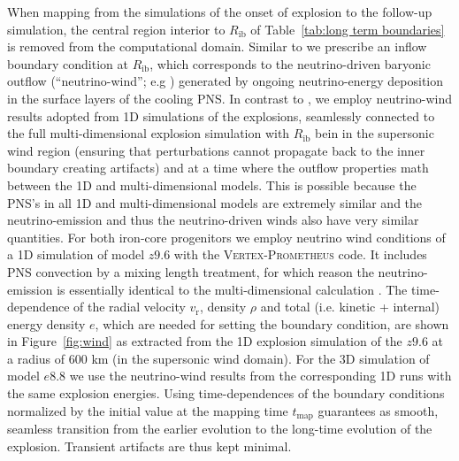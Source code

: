 \documentclass[fleqn,usenatbib]{mnras}
\newcommand{\vertexprom}{\textsc{Vertex-Prometheus}\xspace}
\newcommand{\GEO}[1]{{\color{red}#1}}
\begin{document}
\GEO{
When mapping from the simulations of the onset of explosion to the follow-up simulation, the central region interior to $R_{\mathrm{ib}}$ of Table~\ref{tab:long term boundaries} is removed from the computational domain. Similar to \cite{Wongwathanarat2015} we prescribe an inflow boundary condition at $R_{\mathrm{ib}}$, which corresponds to the neutrino-driven baryonic outflow (``neutrino-wind''; e.g \citealt{Qian1996}) generated by ongoing neutrino-energy deposition in the surface layers of the cooling PNS. In contrast to \cite{Wongwathanarat2015}, we employ neutrino-wind results adopted from 1D simulations of the explosions, seamlessly connected to the full multi-dimensional explosion simulation with $R_{\mathrm{ib}}$ bein in the supersonic wind region (ensuring that perturbations cannot propagate back to the inner boundary creating artifacts) and at a time where  the outflow properties math between the 1D and multi-dimensional models. This is possible because the PNS's in all 1D and multi-dimensional models are extremely similar and the neutrino-emission and thus the neutrino-driven winds also have very similar quantities. 
For both iron-core progenitors we employ neutrino wind conditions of a 1D simulation of model $z9.6$ with the \vertexprom code. It includes PNS convection by a mixing length treatment, for which reason the neutrino-emission is essentially identical to the multi-dimensional calculation \citep{Mirizzi2016}. The time-dependence of the radial velocity $v_{\mathrm{r}}$, density $\rho$ and total (i.e. kinetic + internal) energy density $e$, which are needed for setting the boundary condition, are shown in Figure~\ref{fig:wind} as extracted from the 1D explosion simulation of the $z9.6$ at a radius of 600 km (in the supersonic wind domain).
For the 3D simulation of model $e8.8$ we use the neutrino-wind results from the corresponding 1D runs with the same explosion energies. Using time-dependences of the boundary conditions normalized by the initial value at the mapping time $t_{\mathrm{map}}$  guarantees as smooth, seamless transition from the earlier evolution to the long-time evolution of the explosion. Transient artifacts are thus kept minimal.
}
\end{document}
